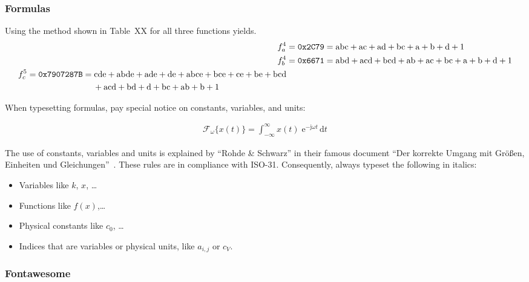 \subsubsection{Formulas}

Using the method shown in Table~XX for all three functions yields.
\begin{align}
f_a^4 &= \mathrm{\texttt{0x2C79}} = \mathrm{abc} + \mathrm{ac} + \mathrm{ad} + \mathrm{bc} + \mathrm{a} + \mathrm{b} + \mathrm{d} + \mathrm{1} \\
f_b^4 &= \mathrm{\texttt{0x6671}} = \mathrm{abd} + \mathrm{acd} + \mathrm{bcd} + \mathrm{ab} + \mathrm{ac} + \mathrm{bc} + \mathrm{a} + \mathrm{b} + \mathrm{d} + \mathrm{1}\\
\begin{split}
f_c^5 &= \mathrm{\texttt{0x7907287B}} = \mathrm{cde} + \mathrm{abde} + \mathrm{ade} + \mathrm{de} + \mathrm{abce} + \mathrm{bce} + \mathrm{ce} + \mathrm{be} + \mathrm{bcd}\\
&\hspace{2.75cm}+ \mathrm{acd} +\mathrm{bd} + \mathrm{d} + \mathrm{bc} + \mathrm{ab} + \mathrm{b} + \mathrm{1}
\end{split}
\end{align}

When typesetting formulas, pay special notice on constants, variables, and units:

 \begin{align}
  \mathcal{F}_{\omega}\{x(t)\} = \int^{\infty}_{-\infty} x(t) \;\mathrm{e}^{-\mathrm{j} \omega t}\,\mathrm{d}t
  \tag{Fourier-Transformation} %
  \end{align}

The use of constants, variables and units is explained by \enquote{Rohde \& Schwarz} in their famous document \enquote{Der korrekte Umgang mit Gr\"{o}\ss{}en, Einheiten und Gleichungen}~\cite{msc:correctuse}. These rules are in compliance with ISO-31. Consequently, always typeset the following in italics:

\begin{itemize}
\item Variables like $k$, $x$, \dots
\item Functions like $f(x)$,\dots
\item Physical constants like $c_0$, \dots
\item Indices that are variables or physical units, like $a_{i, j}$ or $c_V$.
\end{itemize}


\subsubsection{Fontawesome}

